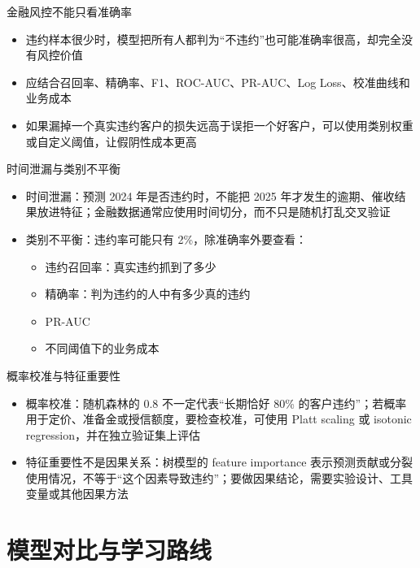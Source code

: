 \documentclass[10pt,aspectratio=43]{beamer}
\begin{document}
\begin{frame}{金融风控不能只看准确率}
  \vfill
  \begin{itemize}
    \item 违约样本很少时，模型把所有人都判为“不违约”也可能准确率很高，却完全没有风控价值
    \item 应结合召回率、精确率、F1、ROC-AUC、PR-AUC、Log Loss、校准曲线和业务成本
    \item 如果漏掉一个真实违约客户的损失远高于误拒一个好客户，可以使用类别权重或自定义阈值，让假阴性成本更高
  \end{itemize}
  \vfill
\end{frame}

\begin{frame}{时间泄漏与类别不平衡}
  \vfill
  \begin{itemize}
    \item 时间泄漏：预测 2024 年是否违约时，不能把 2025 年才发生的逾期、催收结果放进特征；金融数据通常应使用时间切分，而不只是随机打乱交叉验证
    \item 类别不平衡：违约率可能只有 2\%，除准确率外要查看：
      \begin{itemize}
        \item 违约召回率：真实违约抓到了多少
        \item 精确率：判为违约的人中有多少真的违约
        \item PR-AUC
        \item 不同阈值下的业务成本
      \end{itemize}
  \end{itemize}
  \vfill
\end{frame}

\begin{frame}{概率校准与特征重要性}
  \vfill
  \begin{itemize}
    \item 概率校准：随机森林的 0.8 不一定代表“长期恰好 80\% 的客户违约”；若概率用于定价、准备金或授信额度，要检查校准，可使用 Platt scaling 或 isotonic regression，并在独立验证集上评估
    \item 特征重要性不是因果关系：树模型的 feature importance 表示预测贡献或分裂使用情况，不等于“这个因素导致违约”；要做因果结论，需要实验设计、工具变量或其他因果方法
  \end{itemize}
  \vfill
\end{frame}

\section{模型对比与学习路线}
\end{document}
